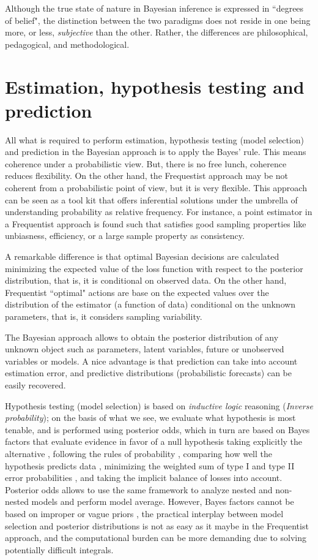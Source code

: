 Although the true state of nature in Bayesian inference is expressed in ``degrees of belief", the distinction between the two paradigms does not reside in one being more, or less, \textit{subjective} than the other. Rather, the differences are philosophical, pedagogical, and methodological.

\section{Estimation, hypothesis testing and prediction}\label{sec23}

All what is required to perform estimation, hypothesis testing (model selection) and prediction in the Bayesian approach is to apply the Bayes' rule. This means coherence under a probabilistic view. But, there is no free lunch, coherence reduces flexibility. On the other hand, the Frequestist approach may be not coherent from a probabilistic point of view, but it is very flexible. This approach can be seen as a tool kit that offers inferential solutions under the umbrella of understanding probability as relative frequency. For instance, a point estimator in a Frequentist approach is found such that satisfies good sampling properties like unbiasness, efficiency, or a large sample property as consistency.

A remarkable difference is that optimal Bayesian decisions are calculated minimizing the expected value of the loss function with respect to the posterior distribution, that is, it is conditional on observed data. On the other hand, Frequentist ``optimal" actions are base on the expected values over the distribution of the estimator (a function of data) conditional on the unknown parameters, that is, it considers sampling variability.

The Bayesian approach allows to obtain the posterior distribution of any unknown object such as parameters, latent variables, future or unobserved variables or models. A nice advantage is that prediction can take into account estimation error, and predictive distributions (probabilistic forecasts) can be easily recovered. 

Hypothesis testing (model selection) is based on \textit{inductive logic} reasoning (\textit{Inverse probability}); on the basis of what we see, we evaluate what hypothesis is most tenable, and is performed using posterior odds, which in turn are based on Bayes factors that evaluate evidence in favor of a null hypothesis taking explicitly the alternative \cite{Kass1995}, following the rules of probability \cite{Lindley2000}, comparing how well the hypothesis predicts data \cite{Goodman1999}, minimizing the weighted sum of type I and type II error probabilities \cite{DeGroot1975,Pericchip}, and taking the implicit balance of losses \cite{Jeffreys1961,Bernardo1994} into account. Posterior odds allows to use the same framework to analyze nested and non-nested models and perform model average. However, Bayes factors cannot be based on improper or vague priors \cite{koop2003bayesian}, the practical interplay between model selection and posterior distributions is not as easy as it maybe in the Frequentist approach, and the computational burden can be more demanding due to solving potentially difficult integrals.

